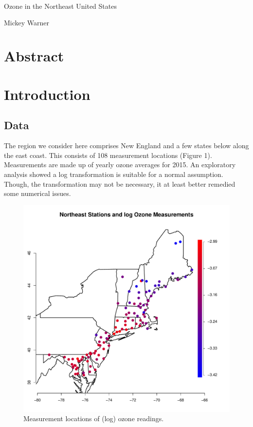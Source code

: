 \documentclass[12pt]{article}
\begin{document}
\begin{center}
\begin{huge}
Ozone in the Northeast United States
\end{huge}
\bigskip

Mickey Warner
\end{center}

\section{Abstract}

\section{Introduction}

\subsection{Data}

The region we consider here comprises New England and a few states below along the east coast. This consists of 108 measurement locations (Figure 1). Measurements are made up of yearly ozone averages for 2015. An exploratory analysis showed a log transformation is suitable for a normal assumption. Though, the transformation may not be necessary, it at least better remedied some numerical issues.

\begin{figure}[ht]
\begin{center}
\includegraphics[scale=0.5]{figs/data.pdf}
\end{center}
\caption{Measurement locations of (log) ozone readings.}
\end{figure}
\end{document}
